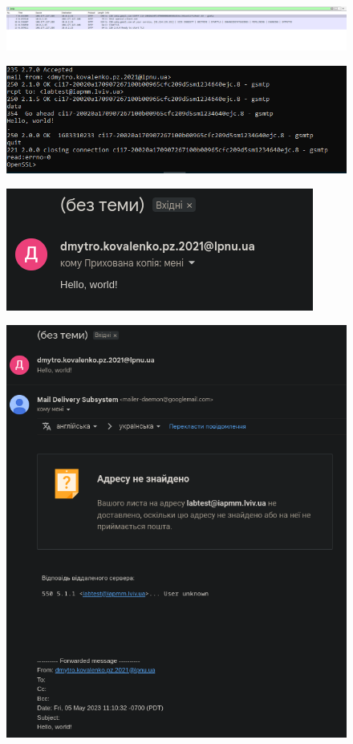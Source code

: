 \documentclass{article}
\begin{document}
\begin{normalsize}
\begin{figure}[H]
\end{figure}
\begin{figure}[H]
	\centering
	\includegraphics[width=\textwidth]{13}
\end{figure}
\begin{figure}[H]
	\centering
	\includegraphics[width=\textwidth]{15}
\end{figure}
\begin{figure}[H]
	\centering
	\includegraphics[width=\textwidth]{14}
\end{figure}
\begin{figure}[H]
	\centering
	\includegraphics[width=\textwidth]{16}

\end{figure}
\end{normalsize}
\end{document}
